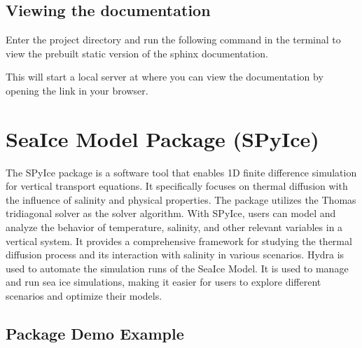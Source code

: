 \documentclass[a4paper,11pt,english,openany]{sphinxmanual}
\begin{document}
\subsection{Viewing the documentation}
\label{\detokenize{quick_start/installation:viewing-the-documentation}}
\sphinxAtStartPar
Enter the project directory and run the following command in the terminal to view the pre\sphinxhyphen{}built static version of the sphinx documentation.
\begin{quote}

\sphinxAtStartPar
{}
\end{quote}

\sphinxAtStartPar
This will start a local server at  where you can view the documentation by opening the link in your browser.

\sphinxstepscope


\section{Sea\sphinxhyphen{}Ice Model Package (SPyIce)}
\label{\detokenize{quick_start/example/main_original:Sea-Ice-Model-Package-(SPyIce)}}\label{\detokenize{quick_start/example/main_original::doc}}
\sphinxAtStartPar
The SPyIce package is a software tool that enables 1D finite difference simulation for vertical transport equations. It specifically focuses on thermal diffusion with the influence of salinity and physical properties. The package utilizes the Thomas tridiagonal solver as the solver algorithm. With SPyIce, users can model and analyze the behavior of temperature, salinity, and other relevant variables in a vertical system. It provides a comprehensive framework for studying the thermal diffusion
process and its interaction with salinity in various scenarios. Hydra is used to automate the simulation runs of the Sea\sphinxhyphen{}Ice Model. It is used to manage and run sea ice simulations, making it easier for users to explore different scenarios and optimize their models.


\subsection{Package Demo Example}
\label{\detokenize{quick_start/example/main_original:Package-Demo-Example}}
\end{document}
